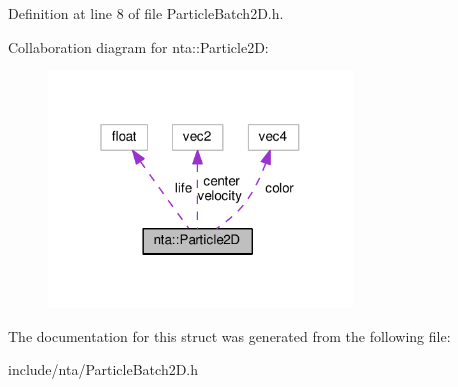 Definition at line 8 of file Particle\+Batch2\+D.\+h.



Collaboration diagram for nta\+:\+:Particle2D\+:\nopagebreak
\begin{figure}[H]
\begin{center}
\leavevmode
\includegraphics[width=229pt]{df/d87/structnta_1_1Particle2D__coll__graph}
\end{center}
\end{figure}


The documentation for this struct was generated from the following file\+:\begin{DoxyCompactItemize}
\item 
include/nta/Particle\+Batch2\+D.\+h\end{DoxyCompactItemize}
